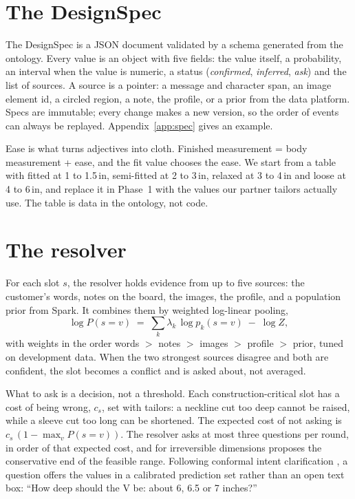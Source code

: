 \section{The DesignSpec}

The DesignSpec is a JSON document validated by a schema generated from the ontology. Every value is an object with five fields: the value itself, a probability, an interval when the value is numeric, a status (\emph{confirmed}, \emph{inferred}, \emph{ask}) and the list of sources. A source is a pointer: a message and character span, an image element id, a circled region, a note, the profile, or a prior from the data platform. Specs are immutable; every change makes a new version, so the order of events can always be replayed. Appendix~\ref{app:spec} gives an example.

Ease is what turns adjectives into cloth. Finished measurement = body measurement + ease, and the fit value chooses the ease. We start from a table with fitted at 1 to 1.5\,in, semi-fitted at 2 to 3\,in, relaxed at 3 to 4\,in and loose at 4 to 6\,in, and replace it in Phase~1 with the values our partner tailors actually use. The table is data in the ontology, not code.

\section{The resolver}

For each slot $s$, the resolver holds evidence from up to five sources: the customer's words, notes on the board, the images, the profile, and a population prior from Spark. It combines them by weighted log-linear pooling,
\begin{equation}
\log P(s = v) \;=\; \sum_{k} \lambda_k \,\log p_k(s=v) \;-\; \log Z,
\end{equation}
with weights in the order words $>$ notes $>$ images $>$ profile $>$ prior, tuned on development data. When the two strongest sources disagree and both are confident, the slot becomes a conflict and is asked about, not averaged.

What to ask is a decision, not a threshold. Each construction-critical slot has a cost of being wrong, $c_s$, set with tailors: a neckline cut too deep cannot be raised, while a sleeve cut too long can be shortened. The expected cost of not asking is $c_s\,(1-\max_v P(s=v))$. The resolver asks at most three questions per round, in order of that expected cost, and for irreversible dimensions proposes the conservative end of the feasible range. Following conformal intent clarification \cite{hengst2024cicc}, a question offers the values in a calibrated prediction set rather than an open text box: ``How deep should the V be: about 6, 6.5 or 7 inches?''

